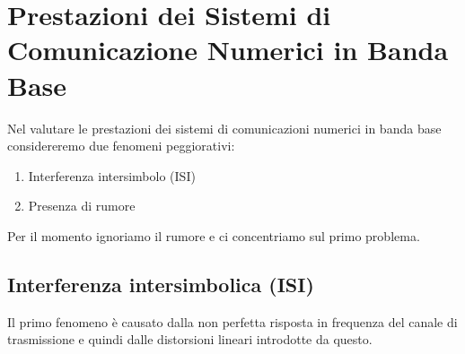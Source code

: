 \section*{Prestazioni dei Sistemi di Comunicazione Numerici in Banda Base}
Nel valutare le prestazioni dei sistemi di comunicazioni numerici in banda base considereremo due fenomeni peggiorativi:
\begin{enumerate}
  \item Interferenza intersimbolo (ISI)
  \item Presenza di rumore
\end{enumerate}

Per il momento ignoriamo il rumore e ci concentriamo sul primo problema.

\subsection*{Interferenza intersimbolica (ISI)}
Il primo fenomeno è causato dalla non perfetta risposta in frequenza del canale di trasmissione e quindi dalle distorsioni lineari introdotte da questo.

